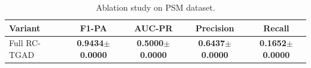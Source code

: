 \begin{table}[h]
\centering
\caption{Ablation study on PSM dataset.}
\label{tab:ablation}
\begin{tabular}{lcccc}
\toprule
\textbf{Variant} & \textbf{F1-PA} & \textbf{AUC-PR} & \textbf{Precision} & \textbf{Recall} \\
\midrule
Full RC-TGAD & \textbf{0.9434$\pm$0.0000} & \textbf{0.5000$\pm$0.0000} & \textbf{0.6437$\pm$0.0000} & \textbf{0.1652$\pm$0.0000} \\
\bottomrule
\end{tabular}
\end{table}